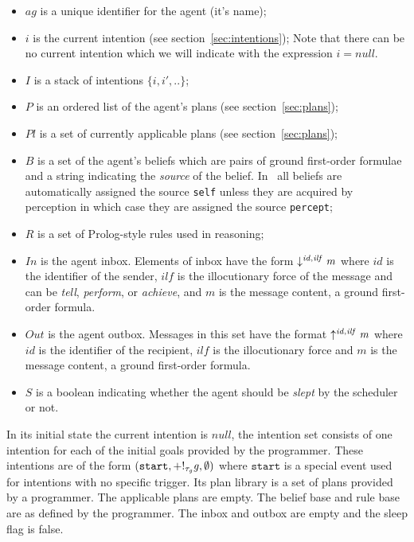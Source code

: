\begin{itemize}
\itemsep1pt
\item $\mathit{ag}$ is a unique identifier for the agent (it's name);
\item $i$ is the current intention (see section~\ref{sec:intentions});  Note that there can be no current intention which we will indicate with the expression $i = null$.  
\item $I$ is a stack of intentions $\lbrace i,i',..\rbrace$;
\item $P$ is an ordered list of the agent's plans (see section~\ref{sec:plans});
\item $\mathit{Pl}$ is a set of currently applicable plans (see section~\ref{sec:plans});
\item $B$ is a set of the agent's beliefs which are pairs of ground first-order formulae and a string indicating the \emph{source} of the belief.  In \gwendolen\ all beliefs are automatically assigned the source \texttt{self} unless they are acquired by perception in which case they are assigned the source \texttt{percept};
  \item $R$ is a set of Prolog-style rules used in reasoning;
\item $\mathit{In}$ is the agent inbox. Elements of inbox have the form $\mathit{\downarrow^{id,\mathit{ilf}}m}$ where $\mathit{id}$ is the identifier of the sender, $\mathit{ilf}$ is the illocutionary force of the message and can be \emph{tell}, \emph{perform}, or \emph{achieve}, and $m$ is the message content, a ground first-order formula. 
\item $\mathit{Out}$ is the agent outbox. Messages in this set have the format $\mathit{\uparrow^{id,\mathit{ilf}}m}$ where $id$ is the identifier of the recipient, $\mathit{ilf}$ is the illocutionary force and $m$ is the message content, a ground first-order formula.
\item $S$ is a boolean indicating whether the agent should be \emph{slept} by the scheduler or not.
\end{itemize}
In its initial state the current intention is $null$, the intention set consists of one intention for each of the initial goals provided by the programmer.  These intentions are of the form $(\texttt{start}, +!_{\mathit{\tau_{\mathit{g}}}}\mathit{g}, \emptyset)$ where $\texttt{start}$ is a special event used for intentions with no specific trigger.   Its plan library is a set of plans provided by a programmer.  The applicable plans are empty.  The belief base and rule base are as defined by the programmer.  The inbox and outbox are empty and the sleep flag is false.

